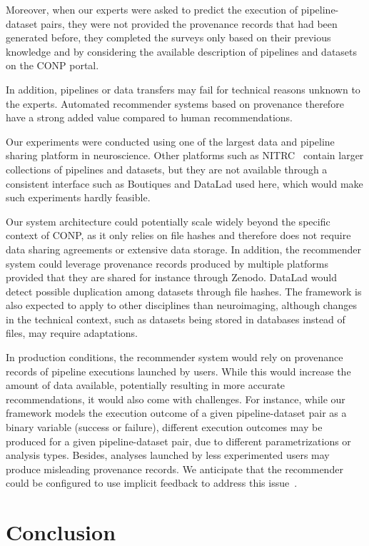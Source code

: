 \documentclass[conference]{IEEEtran}
\begin{document}
Moreover, when our experts were asked to predict the execution of pipeline-dataset pairs, they were not provided the provenance records that had been generated before, they completed the surveys only based on their previous knowledge and by considering the available description of pipelines and datasets on the CONP portal. 

In addition, pipelines or data
transfers may fail for technical reasons unknown to the experts. Automated
recommender systems based on provenance therefore have a strong added value
compared to human recommendations. 

Our experiments were conducted using one of the largest data and pipeline
sharing platform in neuroscience. Other platforms such as
NITRC~\cite{kennedy2016nitrc} contain larger collections of
pipelines and datasets, but they are not available through a consistent
interface such as Boutiques and DataLad used here, which would make
such experiments hardly feasible.

Our system architecture could potentially scale widely beyond the specific
context of CONP, as it only relies on file hashes and therefore does not
require data sharing agreements or extensive data storage. In addition, the
recommender system could leverage provenance records produced by multiple
platforms provided that they are shared for instance through Zenodo.
DataLad would detect possible duplication among datasets through file hashes. 
The framework is also expected to apply to other disciplines than neuroimaging, 
although changes in the technical context, such as datasets being stored in 
databases instead of files, may require adaptations.

In production conditions, the recommender system would rely on provenance
records of pipeline executions launched by users. While this would increase
the amount of data available, potentially resulting in more accurate
recommendations, it would also come with challenges. For instance, while
our framework models the execution outcome of a given pipeline-dataset pair
as a binary variable (success or failure), different execution outcomes may
be produced for a given pipeline-dataset pair, due to different
parametrizations or analysis types. Besides, analyses launched by less
experimented users may produce misleading provenance records. We anticipate
that the recommender could be configured to use implicit feedback to address 
this issue~\cite{hu2008collaborative}.

\section{Conclusion}
\end{document}
